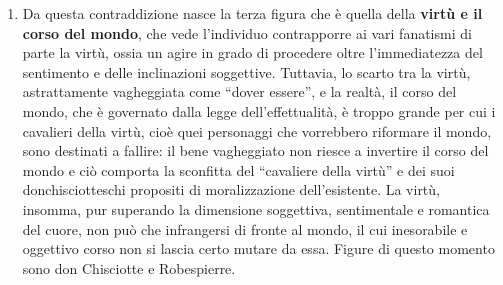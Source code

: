 \documentclass[a4paper,12pt,oneside,openany]{book}%
\begin{document}
\begin{enumerate}
	\item Da questa contraddizione nasce la terza figura che è quella della \textbf{virtù e il corso del mondo}, che vede l’individuo contrapporre ai vari fanatismi di parte la virtù, ossia un agire in grado di procedere oltre l’immediatezza del sentimento e delle inclinazioni soggettive. Tuttavia, lo scarto tra la virtù, astrattamente vagheggiata come “dover essere”, e la realtà, il corso del mondo, che è governato dalla legge dell’effettualità, è troppo grande per cui i cavalieri della virtù, cioè quei personaggi che vorrebbero riformare il mondo, sono destinati a fallire: il bene vagheggiato non riesce a invertire il corso del mondo e ciò comporta la sconfitta del “cavaliere della virtù” e dei suoi donchisciotteschi propositi di moralizzazione dell’esistente. La virtù, insomma, pur superando la dimensione soggettiva, sentimentale e romantica del cuore, non può che infrangersi di fronte al mondo, il cui inesorabile e oggettivo corso non si lascia certo mutare da essa. Figure di questo momento sono don Chisciotte e Robespierre.
\end{enumerate}
\end{document}

